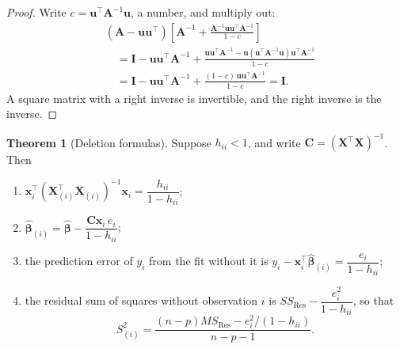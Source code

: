 \documentclass[11pt,a4paper]{article}
\numberwithin{equation}{section}
\theoremstyle{definition}
\newtheorem{thm}{Theorem}[subsection]
\begin{document}
\begin{proof}
Write $c = \mathbf{u}^\top\mathbf{A}^{-1}\mathbf{u}$, a number, and multiply out:
\begin{align*}
&(\mathbf{A} - \mathbf{u}\mathbf{u}^\top)\left[\mathbf{A}^{-1} + \frac{\mathbf{A}^{-1}\mathbf{u}\mathbf{u}^\top\mathbf{A}^{-1}}{1 - c}\right] \\
&\quad= \mathbf{I} - \mathbf{u}\mathbf{u}^\top\mathbf{A}^{-1}
 + \frac{\mathbf{u}\mathbf{u}^\top\mathbf{A}^{-1} - \mathbf{u}(\mathbf{u}^\top\mathbf{A}^{-1}\mathbf{u})\mathbf{u}^\top\mathbf{A}^{-1}}{1 - c} \\
&\quad= \mathbf{I} - \mathbf{u}\mathbf{u}^\top\mathbf{A}^{-1}
 + \frac{(1 - c)\,\mathbf{u}\mathbf{u}^\top\mathbf{A}^{-1}}{1 - c}
= \mathbf{I} .
\end{align*}
A square matrix with a right inverse is invertible, and the right inverse is the inverse.
\end{proof}

\begin{thm}[Deletion formulas]\label{thm:deletion}
Suppose $h_{ii} < 1$, and write $\mathbf{C} = (\mathbf{X}^\top\mathbf{X})^{-1}$. Then
\begin{enumerate}[label=(\roman*)]
\item $\mathbf{x}_i^\top(\mathbf{X}_{(i)}^\top\mathbf{X}_{(i)})^{-1}\mathbf{x}_i = \dfrac{h_{ii}}{1 - h_{ii}}$;
\item $\hat{\boldsymbol\beta}_{(i)} = \hat{\boldsymbol\beta} - \dfrac{\mathbf{C}\mathbf{x}_i\, e_i}{1 - h_{ii}}$;
\item the prediction error of $y_i$ from the fit without it is
$y_i - \mathbf{x}_i^\top\hat{\boldsymbol\beta}_{(i)} = \dfrac{e_i}{1 - h_{ii}}$;
\item the residual sum of squares without observation $i$ is
$SS_{\mathrm{Res}} - \dfrac{e_i^2}{1 - h_{ii}}$, so that
\[
S^2_{(i)} = \frac{(n - p)MS_{\mathrm{Res}} - e_i^2/(1 - h_{ii})}{n - p - 1} .
\]
\end{enumerate}
\end{thm}
\end{document}
